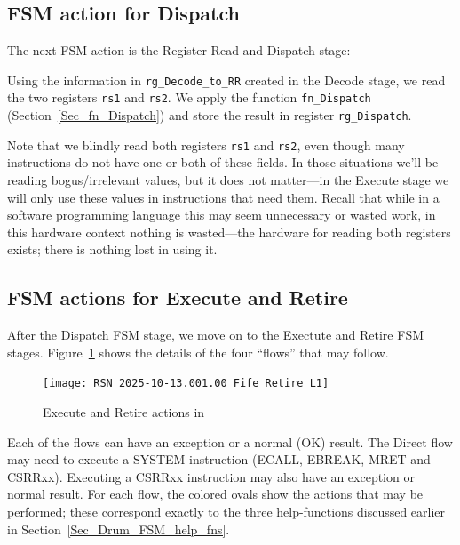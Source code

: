 \subsection{FSM action for Dispatch}

The next FSM action is the Register-Read and Dispatch stage:


Using the information in \verb|rg_Decode_to_RR| created in the Decode
stage, we read the two registers \verb|rs1| and \verb|rs2|.  We apply
the function \verb|fn_Dispatch| (Section~\ref{Sec_fn_Dispatch}) and
store the result in register \verb|rg_Dispatch|.

Note that we blindly read both registers \verb|rs1| and \verb|rs2|,
even though many instructions do not have one or both of these fields.
In those situations we'll be reading bogus/irrelevant values, but it
does not matter---in the Execute stage we will only use these values
in instructions that need them. Recall that while in a software
programming language this may seem unnecessary or wasted work, in this
hardware context nothing is wasted---the hardware for reading both
registers exists; there is nothing lost in using it.


\subsection{FSM actions for Execute and Retire}

After the Dispatch FSM stage, we move on to the Exectute and Retire
FSM stages.  Figure~\ref{Fig_Retire_Drum} shows the details of the
four ``flows'' that may follow.
\begin{figure}[htbp]
  \centerline{\texttt{[image: RSN\_2025-10-13.001.00\_Fife\_Retire\_L1]}}
  \caption{\label{Fig_Retire_Drum}Execute and Retire actions in {\DRUM}}
\end{figure}
Each of the flows can have an exception or a normal (OK) result.  The
Direct flow may need to execute a SYSTEM instruction (ECALL, EBREAK,
MRET and CSRRxx).  Executing a CSRRxx instruction may also have an
exception or normal result.  For each flow, the colored ovals show the
actions that may be performed; these correspond exactly to the three
help-functions discussed earlier in
Section~\ref{Sec_Drum_FSM_help_fns}.


